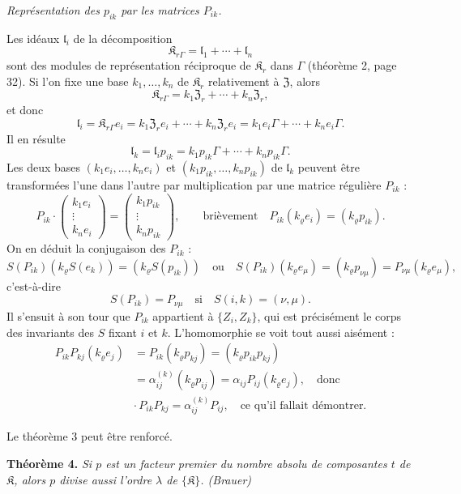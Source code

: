 \emph{Représentation des \(p_{ik}\) par les matrices \(P_{ik}\).}

Les idéaux \(\mathfrak l_i\) de la décomposition
\[
\mathfrak K_{r\Gamma}=\mathfrak l_1+\cdots+\mathfrak l_n
\]
sont des modules de représentation réciproque de \(\mathfrak K_r\) dans \(\Gamma\) (théorème 2, page 32). Si l'on fixe une base \(k_1,\ldots,k_n\) de \(\mathfrak K_r\) relativement à \(\mathfrak Z\), alors
\[
\mathfrak K_{r\Gamma}=k_1\mathfrak Z_r+\cdots+k_n\mathfrak Z_r,
\]
et donc
\[
\mathfrak l_i=\mathfrak K_{r\Gamma}e_i
=k_1\mathfrak Z_r e_i+\cdots+k_n\mathfrak Z_r e_i
=k_1e_i\Gamma+\cdots+k_ne_i\Gamma.
\]
Il en résulte
\[
\mathfrak l_k=\mathfrak l_i p_{ik}
=k_1p_{ik}\Gamma+\cdots+k_np_{ik}\Gamma.
\]
Les deux bases \((k_1e_i,\ldots,k_ne_i)\) et \((k_1p_{ik},\ldots,k_np_{ik})\) de \(\mathfrak l_k\) peuvent être transformées l'une dans l'autre par multiplication par une matrice régulière \(P_{ik}\) :
\[
P_{ik}\cdot
\begin{pmatrix}
k_1e_i\\ \vdots\\ k_ne_i
\end{pmatrix}
=
\begin{pmatrix}
k_1p_{ik}\\ \vdots\\ k_np_{ik}
\end{pmatrix},
\qquad
\text{brièvement}\quad
P_{ik}(k_\varrho e_i)=(k_\varrho p_{ik}).
\]
On en déduit la conjugaison des \(P_{ik}\) :
\[
S(P_{ik})(k_\varrho S(e_k))=(k_\varrho S(p_{ik}))
\quad\text{ou}\quad
S(P_{ik})(k_\varrho e_\mu)=(k_\varrho p_{\nu\mu})
=P_{\nu\mu}(k_\varrho e_\mu),
\]
c'est-à-dire
\[
S(P_{ik})=P_{\nu\mu}\quad\text{si}\quad S(i,k)=(\nu,\mu).
\]
Il s'ensuit à son tour que \(P_{ik}\) appartient à \(\{Z_i,Z_k\}\), qui est précisément le corps des invariants des \(S\) fixant \(i\) et \(k\). L'homomorphie se voit tout aussi aisément :
\[
\begin{split}
P_{ik}P_{kj}(k_\varrho e_j)
&=P_{ik}(k_\varrho p_{kj})
=(k_\varrho p_{ik}p_{kj})\\
&=\alpha_{ij}^{(k)}(k_\varrho p_{ij})
=\alpha_{ij}P_{ij}(k_\varrho e_j),
\quad\text{donc}\\
&\cdot\, P_{ik}P_{kj}=\alpha_{ij}^{(k)}P_{ij},
\quad\text{ce qu'il fallait démontrer.}
\end{split}
\]

Le théorème 3 peut être renforcé.

\textbf{Théorème 4.} \emph{Si \(p\) est un facteur premier du nombre absolu de composantes \(t\) de \(\mathfrak K\), alors \(p\) divise aussi l'ordre \(\lambda\) de \(\{\mathfrak K\}\). (Brauer)}

